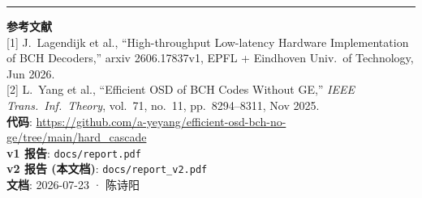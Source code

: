 \documentclass[11pt,a4paper]{article}
\begin{document}
\vspace{6pt}
\hrule
\vspace{4pt}
\noindent\footnotesize{
\textbf{参考文献}\\
{[1]} J.\ Lagendijk et al., ``High-throughput Low-latency Hardware Implementation of BCH Decoders,''
arxiv 2606.17837v1, EPFL + Eindhoven Univ.\ of Technology, Jun 2026.\\
{[2]} L.\ Yang et al., ``Efficient OSD of BCH Codes Without GE,''
{\it IEEE Trans.\ Inf.\ Theory}, vol.\ 71, no.\ 11, pp.\ 8294--8311, Nov 2025.\\
\textbf{代码}: \url{https://github.com/a-yeyang/efficient-osd-bch-no-ge/tree/main/hard_cascade}\\
\textbf{v1 报告}: \texttt{docs/report.pdf}\\
\textbf{v2 报告 (本文档)}: \texttt{docs/report\_v2.pdf}\\
\textbf{文档}: 2026-07-23 · 陈诗阳
}
\end{document}
